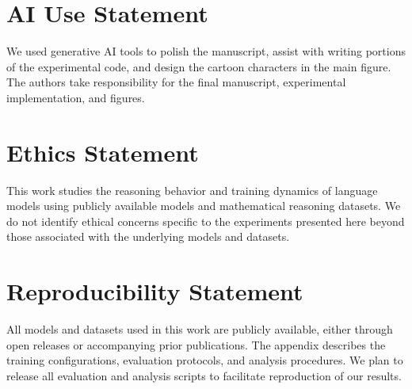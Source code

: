 \section*{AI Use Statement}

We used generative AI tools to polish the manuscript, assist with writing
portions of the experimental code, and design the cartoon characters in the
main figure. The authors take responsibility for the final manuscript,
experimental implementation, and figures.

\section*{Ethics Statement}

This work studies the reasoning behavior and training dynamics of language
models using publicly available models and mathematical reasoning datasets.
We do not identify ethical concerns specific to the experiments presented here
beyond those associated with the underlying models and datasets.

\section*{Reproducibility Statement}

All models and datasets used in this work are publicly available, either
through open releases or accompanying prior publications. The appendix
describes the training configurations, evaluation protocols, and analysis
procedures. We plan to release all evaluation and analysis scripts to
facilitate reproduction of our results.
